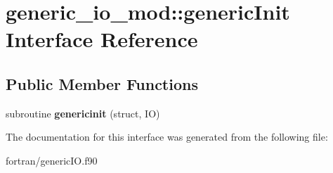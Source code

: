 \hypertarget{interfacegeneric__io__mod_1_1generic_init}{}\section{generic\+\_\+io\+\_\+mod\+:\+:generic\+Init Interface Reference}
\label{interfacegeneric__io__mod_1_1generic_init}
\subsection*{Public Member Functions}
\begin{DoxyCompactItemize}
\item 
\mbox{\label{interfacegeneric__io__mod_1_1generic_init_a91ace3409099209ab981bb5ebe388cb8}} 
subroutine {\bfseries genericinit} (struct, IO)
\end{DoxyCompactItemize}


The documentation for this interface was generated from the following file\+:\begin{DoxyCompactItemize}
\item 
fortran/generic\+I\+O.\+f90\end{DoxyCompactItemize}
